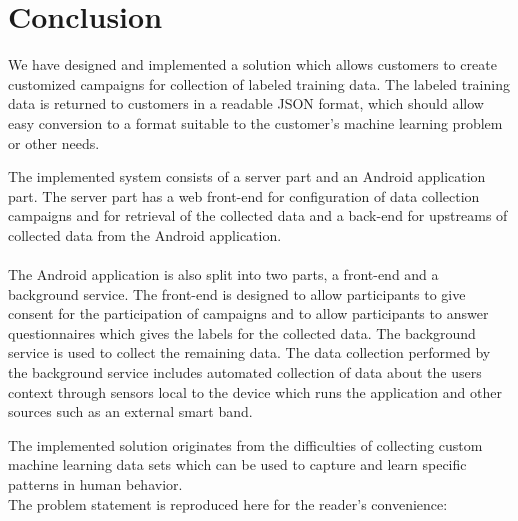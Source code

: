 
\chapter{Conclusion}
\label{cha:conclusion}

We have designed and implemented a solution which allows customers to create customized campaigns for collection of labeled training data. The labeled training data is returned to customers in a readable JSON format, which should allow easy conversion to a format suitable to the customer's machine learning problem or other needs. 

The implemented system consists of a server part and an Android application part. The server part has a web front-end for configuration of data collection campaigns and for retrieval of the collected data and a back-end for upstreams of collected data from the Android application. 
\\\\
The Android application is also split into two parts, a front-end and a background service. The front-end is designed to allow participants to give consent for the participation of campaigns and to allow participants to answer questionnaires which gives the labels for the collected data. The background service is used to collect the remaining data. The data collection performed by the background service includes automated collection of data about the users context through sensors local to the device which runs the application and other sources such as an external smart band. 


The implemented solution originates from the difficulties of collecting custom machine learning data sets which can be used to capture and learn specific patterns in human behavior.  
\\
The problem statement is reproduced here for the reader's convenience:
\\\\



